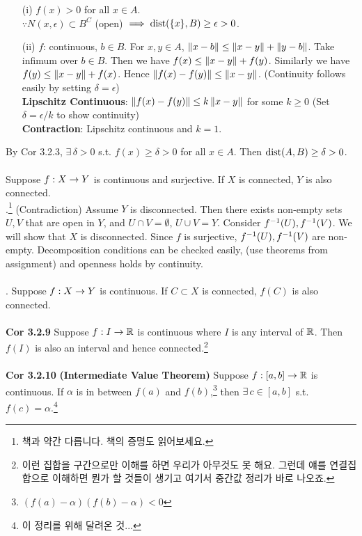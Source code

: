 \begin{enumerate}
	\item[(i)] $f(x) > 0$ for all $x\in A$.\\
	$\because N(x, \epsilon)\subset B^C$ (open) $\implies \text{dist}(\{x\}, B) \geq \epsilon > 0$.
	\item[(ii)] $f$: continuous, $b\in B$. For $x, y\in A$, $\left\lVert x - b\right\rVert \leq \left\lVert x-y\right\rVert + \left\lVert y-b\right\rVert$. Take infimum over $b\in B$. Then we have $f(x) \leq \left\lVert x-y\right\rVert + f(y)$. Similarly we have $f(y) \leq \left\lVert x - y\right\rVert + f(x)$. Hence $\left\lVert f(x) - f(y)\right\rVert \leq \left\lVert x -y\right\rVert$. (Continuity follows easily by setting $\delta = \epsilon$)\\
	\textbf{Lipschitz Continuous}: $\left\lVert f(x) - f(y)\right\rVert \leq k\left\lVert x - y\right\rVert$ for some $k\geq 0$ (Set $\delta = \epsilon / k$ to show continuity)\\
	\textbf{Contraction}: Lipschitz continuous and $k = 1$.
\end{enumerate}
By Cor 3.2.3, $\exists\,\delta > 0$ s.t. $f(x) \geq \delta > 0$ for all $x\in A$. Then $\text{dist}(A, B) \geq \delta > 0$.\\
\\
 Suppose $f:X\rightarrow Y$ is continuous and surjective. If $X$ is connected, $Y$ is also connected.\\
\pf.\footnote{책과 약간 다릅니다. 책의 증명도 읽어보세요.} (Contradiction) Assume $Y$ is disconnected. Then there exists non-empty sets $U, V$ that are open in $Y$, and $U\cap V = \emptyset$, $U\cup V = Y$. Consider $f^{-1}(U), f^{-1}(V)$. We will show that $X$ is disconnected. Since $f$ is surjective, $f^{-1}(U), f^{-1}(V)$ are non-empty. Decomposition conditions can be checked easily, (use theorems from assignment) and openness holds by continuity.\\
\\
\rmk. Suppose $f:X\rightarrow Y$ is continuous. If $C\subset X$ is connected, $f(C)$ is also connected.\\
\\
\textbf{Cor 3.2.9} Suppose $f:I\rightarrow \mathbb{R}$ is continuous where $I$ is any interval of $\mathbb{R}$. Then $f(I)$ is also an interval and hence connected.\footnote{이런 집합을 구간으로만 이해를 하면 우리가 아무것도 못 해요. 그런데 얘를 연결집합으로 이해하면 뭔가 할 것들이 생기고 여기서 중간값 정리가 바로 나오죠.}\\
\\
\textbf{Cor 3.2.10} \textbf{(Intermediate Value Theorem)} Suppose $f:[a, b] \rightarrow \mathbb{R}$ is continuous. If $\alpha$ is in between $f(a)$ and $f(b)$,\footnote{$(f(a) - \alpha)(f(b) - \alpha) < 0$} then $\exists\,c\in [a, b]$ s.t. $f(c) = \alpha$.\footnote{이 정리를 위해 달려온 것...}\\
